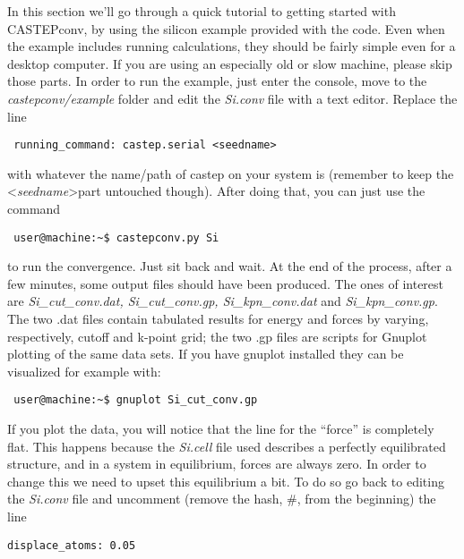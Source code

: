 \documentclass[10pt]{article}
\begin{document}
In this section we'll go through a quick tutorial to getting started with CASTEPconv, by using the silicon example provided with the code. Even when the example includes running calculations, they should be fairly simple even for a desktop computer. If you are using an especially old or slow machine, please skip those parts.\newline
In order to run the example, just enter the console, move to the \textit{castepconv/example} folder and edit the \textit{Si.conv} file with a text editor. Replace the line

\begin{lstlisting}
 running_command: castep.serial <seedname>
\end{lstlisting}

with whatever the name/path of castep on your system is (remember to keep the \textless \textit{seedname}\textgreater part untouched though). After doing that, you can just use the command

\begin{lstlisting}
 user@machine:~$ castepconv.py Si
\end{lstlisting}

to run the convergence. Just sit back and wait. At the end of the process, after a few minutes, some output files should have been produced. The ones of interest are \textit{Si\_cut\_conv.dat, Si\_cut\_conv.gp, Si\_kpn\_conv.dat} and \textit{Si\_kpn\_conv.gp}. The two .dat files contain tabulated results for energy and forces by varying, respectively, cutoff and k-point grid; the two .gp files are scripts for Gnuplot plotting of the same data sets. If you have gnuplot installed they can be visualized for example with:

\begin{lstlisting}
 user@machine:~$ gnuplot Si_cut_conv.gp
\end{lstlisting}

If you plot the data, you will notice that the line for the ``force'' is completely flat. This happens because the \textit{Si.cell} file used describes a perfectly equilibrated structure, and in a system in equilibrium, forces are always zero. In order to change this we need to upset this equilibrium a bit. To do so go back to editing the \textit{Si.conv} file and uncomment (remove the hash, \#, from the beginning) the line

\begin{lstlisting}
displace_atoms: 0.05
\end{lstlisting}
\end{document}
